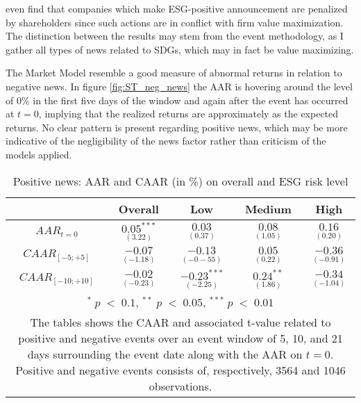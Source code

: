 \cite{fisher2011voluntary} even find that companies which make ESG-positive announcement are penalized by shareholders since such actions are in conflict with firm value maximization. The distinction between the results may stem from the event methodology, as I gather all types of news related to SDGs, which may in fact be value maximizing. 

The Market Model resemble a good measure of abnormal returns in relation to negative news. In figure \ref{fig:ST_neg_news} the AAR is hovering around the level of 0\% in the first five days of the window and again after the event has occurred at $t = 0$, implying that the realized returns are approximately as the expected returns. No clear pattern is present regarding positive news, which may be more indicative of the negligibility of the news factor rather than criticism of the models applied.   

\begin{table}[H]
\centering
\caption{Positive news: AAR and CAAR (in \%) on overall and ESG risk level} 
\begin{tabular}{ccccc}
  \hline  \hline
  & \multicolumn{1}{c}{Overall} &  \multicolumn{1}{c}{Low} & \multicolumn{1}{c}{Medium} & \multicolumn{1}{c}{High}\\  
 \hline
$AAR_{t=0}$ &  $\underset{(3.22)}{0.05^{***}}$ & $\underset{(0.37)}{0.03}$ & $\underset{(1.05)}{0.08}$ &  $\underset{(0.20)}{0.16}$ \\ 
$CAAR_{[-5;+5]}$  & $\underset{(-1.18)}{-0.07}$ &  $\underset{(-0-55)}{-0.13 }$ &  $\underset{(0.22)}{0.05 }$ &  $\underset{(-0.91)}{-0.36}$ \\ 
$CAAR_{[-10;+10]}$    & $\underset{(-0.23)}{-0.02}$ &  $\underset{(-2.25)}{-0.23^{***}}$ &  $\underset{(1.86)}{0.24^{**}}$ &  $\underset{(-1.04)}{-0.34}$ \\ 
    \hline \hline
   \multicolumn{5}{p{10cm}}{ \footnotesize $^* \; p\; <\; 0.1$, $ ^{**} \; p\; <\; 0.05$, $ ^{***} \; p\; <\; 0.01$  } \\
   \multicolumn{5}{p{10cm}}{\footnotesize The tables shows the CAAR and associated t-value related to positive and negative events over an event window of 5, 10, and 21 days surrounding the event date along with the AAR on $t=0$. Positive and negative events consists of, respectively, 3564 and 1046 observations. } \\
   \hline
\end{tabular}
\label{tab: ST_pos_significance}
\end{table}


